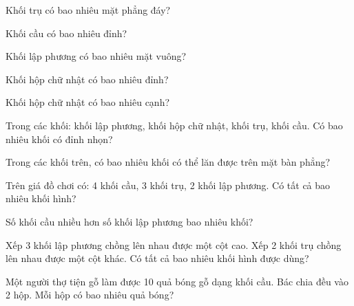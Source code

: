 \begin{ex}
Khối trụ có bao nhiêu mặt phẳng đáy?
\end{ex}

\begin{ex}
Khối cầu có bao nhiêu đỉnh?
\end{ex}

\begin{ex}
Khối lập phương có bao nhiêu mặt vuông?
\end{ex}

\begin{ex}
Khối hộp chữ nhật có bao nhiêu đỉnh?
\end{ex}

\begin{ex}
Khối hộp chữ nhật có bao nhiêu cạnh?
\end{ex}

\begin{ex}
Trong các khối: khối lập phương, khối hộp chữ nhật, khối trụ, khối cầu. Có bao nhiêu khối có đỉnh nhọn?
\end{ex}

\begin{ex}
Trong các khối trên, có bao nhiêu khối có thể lăn được trên mặt bàn phẳng?
\end{ex}

\begin{ex}
Trên giá đồ chơi có: 4 khối cầu, 3 khối trụ, 2 khối lập phương. Có tất cả bao nhiêu khối hình?
\end{ex}

\begin{ex}
Số khối cầu nhiều hơn số khối lập phương bao nhiêu khối?
\end{ex}

\begin{ex}
Xếp 3 khối lập phương chồng lên nhau được một cột cao. Xếp 2 khối trụ chồng lên nhau được một cột khác. Có tất cả bao nhiêu khối hình được dùng?
\end{ex}

\begin{ex}
Một người thợ tiện gỗ làm được 10 quả bóng gỗ dạng khối cầu. Bác chia đều vào 2 hộp. Mỗi hộp có bao nhiêu quả bóng?
\end{ex}

